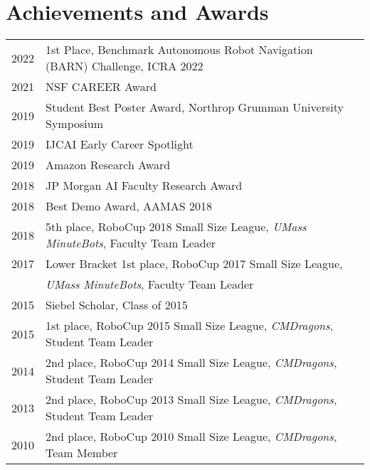 \documentclass[Times]{article}
\begin{document}
\section*{Achievements and Awards}
\begin{tabular}{ p{1.2cm} l }
  2022  & 1st Place, Benchmark Autonomous Robot Navigation (BARN) Challenge,
          ICRA 2022 \\
  2021  & NSF CAREER Award\\
  2019  & Student Best Poster Award, Northrop Grumman University Symposium \\
  2019  & IJCAI Early Career Spotlight \\
  2019  & Amazon Research Award \\
  2018  & JP Morgan AI Faculty Research Award \\
  2018  & Best Demo Award, AAMAS 2018 \\
  2018  & 5th place, RoboCup 2018 Small Size League,
      \emph{UMass MinuteBots}, Faculty Team Leader\\
  2017  & Lower Bracket 1st place, RoboCup 2017 Small Size League, \\
      &\emph{UMass MinuteBots}, Faculty Team Leader\\
  2015  & Siebel Scholar, Class of 2015 \\
  2015  & 1st place, RoboCup 2015 Small Size League,
     \emph{CMDragons}, Student Team Leader\\
  2014  & 2nd place, RoboCup 2014 Small Size League,
     \emph{CMDragons}, Student Team Leader\\
  2013  & 2nd place, RoboCup 2013 Small Size League,
     \emph{CMDragons}, Student Team Leader\\
  2010  & 2nd place, RoboCup 2010 Small Size League,
     \emph{CMDragons}, Team Member\\
\end{tabular}



%
\end{document}
